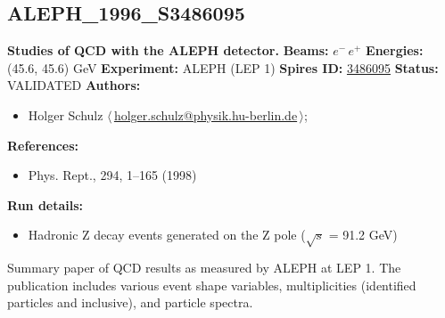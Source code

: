 \subsection[ALEPH\_1996\_S3486095]{ALEPH\_1996\_S3486095\,\cite{Barate:1996fi}}
\textbf{Studies of QCD with the ALEPH detector.}\newline
\textbf{Beams:} $e^-$\,$e^+$ \newline
\textbf{Energies:} (45.6, 45.6) GeV \newline
\textbf{Experiment:} ALEPH (LEP 1) \newline
\textbf{Spires ID:} \href{http://www.slac.stanford.edu/spires/find/hep/www?rawcmd=key+3486095}{3486095}\newline
\textbf{Status:} VALIDATED\newline
\textbf{Authors:}
\begin{itemize}
  \item Holger Schulz $\langle\,$\href{mailto:holger.schulz@physik.hu-berlin.de}{holger.schulz@physik.hu-berlin.de}$\,\rangle$;
\end{itemize}
\textbf{References:}
\begin{itemize}
  \item Phys. Rept., 294, 1--165 (1998)
\end{itemize}
\textbf{Run details:}
\begin{itemize}

  \item Hadronic Z decay events generated on the Z pole (\ensuremath{\sqrt{s}} = 91.2 GeV)\end{itemize}

\noindent Summary paper of QCD results as measured by ALEPH at LEP 1. The publication includes various event shape variables, multiplicities (identified particles and inclusive), and particle spectra.

\clearpage


\clearpage

